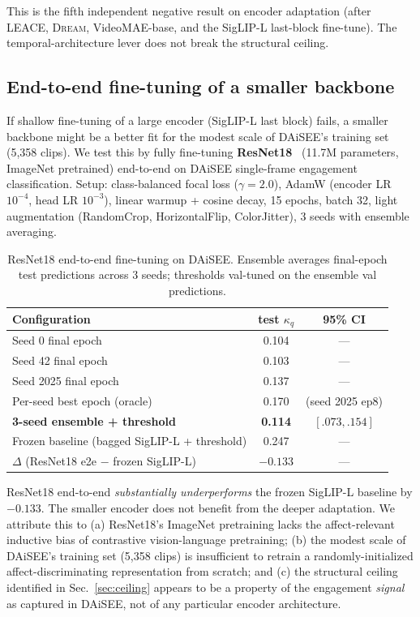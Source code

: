 This is the fifth independent negative result on encoder
adaptation (after LEACE, \textsc{Dream}, VideoMAE-base, and the
SigLIP-L last-block fine-tune). The temporal-architecture lever
does not break the structural ceiling.

\subsection{End-to-end fine-tuning of a smaller backbone}
\label{sec:resnet18}

If shallow fine-tuning of a large encoder (SigLIP-L last block) fails,
a smaller backbone might be a better fit for the modest scale of
DAiSEE's training set (5,358 clips). We test this by fully fine-tuning
\textbf{ResNet18}~\cite{he2016resnet} (11.7M parameters, ImageNet
pretrained) end-to-end on DAiSEE single-frame engagement
classification. Setup: class-balanced focal loss
($\gamma = 2.0$), AdamW (encoder LR $10^{-4}$, head LR $10^{-3}$),
linear warmup + cosine decay, 15 epochs, batch 32, light augmentation
(RandomCrop, HorizontalFlip, ColorJitter), 3 seeds with ensemble
averaging.

\begin{table}[t]
\caption{ResNet18 end-to-end fine-tuning on DAiSEE. Ensemble averages
final-epoch test predictions across 3 seeds; thresholds val-tuned on
the ensemble val predictions.}
\label{tab:resnet18}
\centering
\small
\begin{tabular}{lcc}
\toprule
Configuration & test $\kappa_q$ & 95\% CI \\
\midrule
Seed 0 final epoch & 0.104 & --- \\
Seed 42 final epoch & 0.103 & --- \\
Seed 2025 final epoch & 0.137 & --- \\
Per-seed best epoch (oracle) & 0.170 & (seed 2025 ep8) \\
\textbf{3-seed ensemble + threshold} & \textbf{0.114} & $[.073, .154]$ \\
\midrule
Frozen baseline (bagged SigLIP-L + threshold) & 0.247 & --- \\
$\Delta$ (ResNet18 e2e $-$ frozen SigLIP-L) & $-0.133$ & --- \\
\bottomrule
\end{tabular}
\end{table}

ResNet18 end-to-end \emph{substantially underperforms} the frozen
SigLIP-L baseline by $-0.133$. The smaller encoder does not benefit
from the deeper adaptation. We attribute this to (a) ResNet18's
ImageNet pretraining lacks the affect-relevant inductive bias of
contrastive vision-language pretraining; (b) the modest scale of
DAiSEE's training set (5,358 clips) is insufficient to retrain a
randomly-initialized affect-discriminating representation from
scratch; and (c) the structural ceiling identified in
Sec.~\ref{sec:ceiling} appears to be a property of the engagement
\emph{signal} as captured in DAiSEE, not of any particular encoder
architecture.

